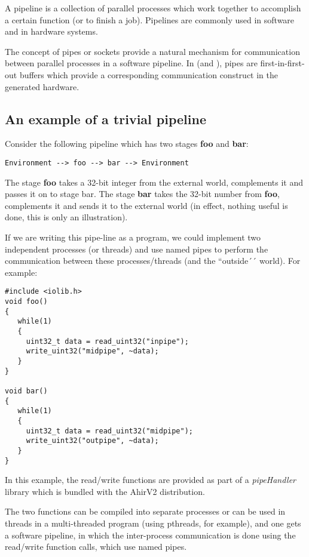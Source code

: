 A pipeline is a collection of parallel processes which
work together to accomplish a certain function (or to finish
a job).   Pipelines are commonly used in software and
in hardware systems.

The concept of pipes or sockets provide a natural mechanism
for communication between parallel processes in a software
pipeline.  In \Aa (and \vC), pipes are first-in-first-out
buffers which provide a corresponding communication construct
in the generated hardware.

\subsection{An example of a trivial pipeline}


Consider the following pipeline which has two stages
{\bf foo} and {\bf bar}:  
\begin{verbatim}
Environment --> foo --> bar --> Environment
\end{verbatim}
The stage {\bf foo} takes a 32-bit
integer from the external world, complements it and passes it on to stage
bar.  The stage {\bf bar} takes the 32-bit number from {\bf foo}, complements
it and sends it to the external world (in effect, nothing useful
is done, this is only an illustration).

If we are writing this pipe-line as a program, we could implement
two independent processes (or threads) and use named pipes to
perform the communication between these processes/threads (and the
``outside´´ world).  For example:
\begin{verbatim}
#include <iolib.h>
void foo()
{
   while(1)
   {
     uint32_t data = read_uint32("inpipe");
     write_uint32("midpipe", ~data);
   }
}

void bar()
{
   while(1)
   {
     uint32_t data = read_uint32("midpipe");
     write_uint32("outpipe", ~data);
   }
}
\end{verbatim}
In this example, the read/write functions are provided
as part of a {\em pipeHandler} library which is bundled with
the AhirV2 distribution.

The two functions can be compiled into separate processes
or can be used in threads in a multi-threaded program (using pthreads, for
example), and one gets a software pipeline, in which
the inter-process communication is done using the
read/write function calls, which use named pipes.

